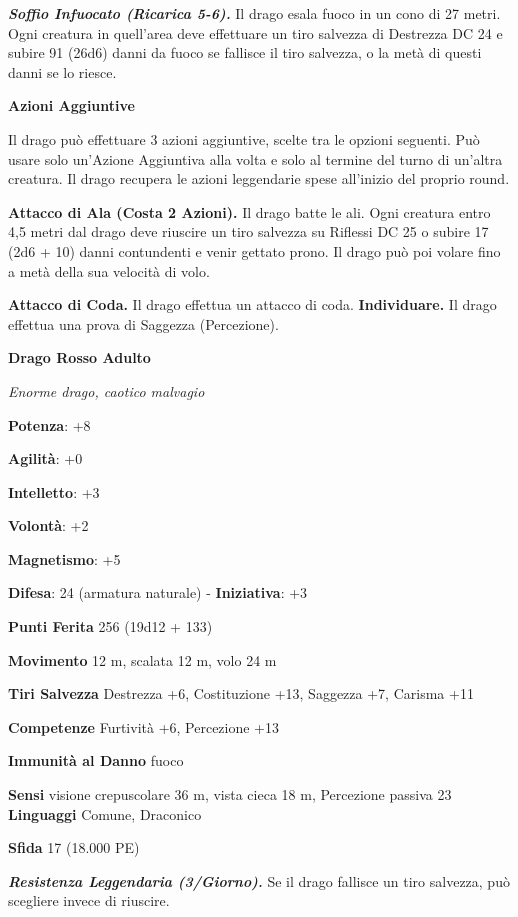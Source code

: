 \begin{multicols}{2}
\emph{\textbf{Soffio Infuocato (Ricarica 5-6).}} Il drago esala fuoco in
un cono di 27 metri. Ogni creatura in quell'area deve effettuare un tiro
salvezza di Destrezza DC 24 e subire 91 (26d6) danni da fuoco se
fallisce il tiro salvezza, o la metà di questi danni se lo riesce.

\textbf{Azioni Aggiuntive}

Il drago può effettuare 3 azioni aggiuntive, scelte tra le opzioni
seguenti. Può usare solo un'Azione Aggiuntiva alla volta e solo al
termine del turno di un'altra creatura. Il drago recupera le azioni
leggendarie spese all'inizio del proprio round.

\textbf{Attacco di Ala (Costa 2 Azioni).} Il drago batte le ali. Ogni
creatura entro 4,5 metri dal drago deve riuscire un tiro salvezza su Riflessi DC 25 o subire 17 (2d6 + 10) danni contundenti e venir gettato
prono. Il drago può poi volare fino a metà della sua velocità di volo.

\textbf{Attacco di Coda.} Il drago effettua un attacco di coda.
\textbf{Individuare.} Il drago effettua una prova di Saggezza
(Percezione).

\textbf{Drago Rosso Adulto}

\emph{Enorme drago, caotico malvagio}

\textbf{Potenza}: +8

\textbf{Agilità}: +0

\textbf{Intelletto}: +3

\textbf{Volontà}: +2

\textbf{Magnetismo}: +5

\textbf{Difesa}: 24 (armatura naturale) - \textbf{Iniziativa}: +3

\textbf{Punti Ferita} 256 (19d12 + 133)

\textbf{Movimento} 12 m, scalata 12 m, volo 24 m

\textbf{Tiri Salvezza} Destrezza +6, Costituzione +13, Saggezza +7,
Carisma +11

\textbf{Competenze} Furtività +6, Percezione +13

\textbf{Immunità al Danno} fuoco

\textbf{Sensi} visione crepuscolare 36 m, vista cieca 18 m, Percezione passiva
23 \textbf{Linguaggi} Comune, Draconico

\textbf{Sfida} 17 (18.000 PE)\smallskip

\emph{\textbf{Resistenza Leggendaria (3/Giorno).}} Se il drago fallisce
un tiro salvezza, può scegliere invece di riuscire.


\end{multicols}
